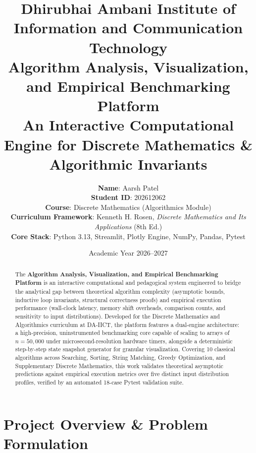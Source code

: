 \documentclass[11pt,a4paper]{article}
\title{
    \vspace{-1.5cm}
    \textbf{\Large Dhirubhai Ambani Institute of Information and Communication Technology}\\
    \vspace{0.3cm}
    \textbf{\LARGE Algorithm Analysis, Visualization, and Empirical Benchmarking Platform}\\
    \vspace{0.2cm}
    \large An Interactive Computational Engine for Discrete Mathematics \& Algorithmic Invariants
}
\author{
    \textbf{Name}: Aarsh Patel\\
    \textbf{Student ID}: 202612062\\
    \textbf{Course}: Discrete Mathematics (Algorithmics Module) \\
    \textbf{Curriculum Framework}: Kenneth H. Rosen, \textit{Discrete Mathematics and Its Applications} (8th Ed.) \\
    \textbf{Core Stack}: Python 3.13, Streamlit, Plotly Engine, NumPy, Pandas, Pytest
}
\date{Academic Year 2026--2027}
\theoremstyle{definition}
\theoremstyle{plain}
\theoremstyle{remark}
\begin{document}

\maketitle
\thispagestyle{fancy}

\begin{abstract}
The \textbf{Algorithm Analysis, Visualization, and Empirical Benchmarking Platform} is an interactive computational and pedagogical system engineered to bridge the analytical gap between theoretical algorithm complexity (asymptotic bounds, inductive loop invariants, structural correctness proofs) and empirical execution performance (wall-clock latency, memory shift overheads, comparison counts, and sensitivity to input distributions). Developed for the Discrete Mathematics and Algorithmics curriculum at DA-IICT, the platform features a dual-engine architecture: a high-precision, uninstrumented benchmarking core capable of scaling to arrays of $n = 50{,}000$ under microsecond-resolution hardware timers, alongside a deterministic step-by-step state snapshot generator for granular visualization. Covering 10 classical algorithms across Searching, Sorting, String Matching, Greedy Optimization, and Supplementary Discrete Mathematics, this work validates theoretical asymptotic predictions against empirical execution metrics over five distinct input distribution profiles, verified by an automated 18-case Pytest validation suite.
\end{abstract}

\vspace{0.5cm}
\tableofcontents
\newpage

\section{Project Overview \& Problem Formulation}
\end{document}
